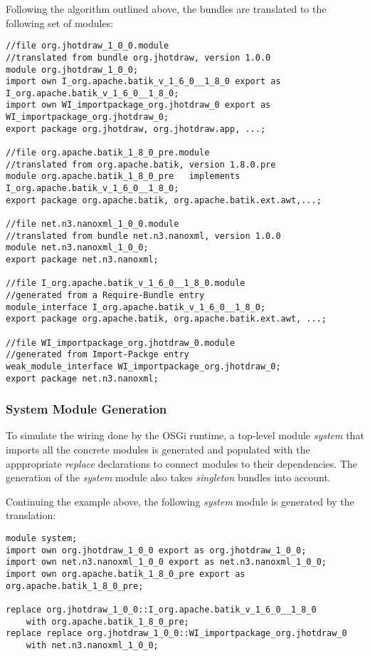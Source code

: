 Following the algorithm outlined above, the bundles are translated to the following set of modules:

\begin{lstlisting}[caption=Translated Bundles]
//file org.jhotdraw_1_0_0.module
//translated from bundle org.jhotdraw, version 1.0.0
module org.jhotdraw_1_0_0;
import own I_org.apache.batik_v_1_6_0__1_8_0 export as I_org.apache.batik_v_1_6_0__1_8_0;
import own WI_importpackage_org.jhotdraw_0 export as WI_importpackage_org.jhotdraw_0;
export package org.jhotdraw, org.jhotdraw.app, ...;

//file org.apache.batik_1_8_0_pre.module
//translated from org.apache.batik, version 1.8.0.pre
module org.apache.batik_1_8_0_pre	implements I_org.apache.batik_v_1_6_0__1_8_0;
export package org.apache.batik, org.apache.batik.ext.awt,...;

//file net.n3.nanoxml_1_0_0.module
//translated from bundle net.n3.nanoxml, version 1.0.0
module net.n3.nanoxml_1_0_0;
export package net.n3.nanoxml;

//file I_org.apache.batik_v_1_6_0__1_8_0.module
//generated from a Require-Bundle entry
module_interface I_org.apache.batik_v_1_6_0__1_8_0;
export package org.apache.batik, org.apache.batik.ext.awt, ...;

//file WI_importpackage_org.jhotdraw_0.module
//generated from Import-Packge entry
weak_module_interface WI_importpackage_org.jhotdraw_0;
export package net.n3.nanoxml;
\end{lstlisting}

\subsubsection{System Module Generation}

To simulate the wiring done by the OSGi runtime, a top-level module \textit{system} that imports all 
the concrete modules is generated and populated with the apppropriate \textit{replace} declarations to connect modules to
their dependencies. The generation of the \textit{system} module also takes \textit{singleton}
bundles into account.

Continuing the example above, the following \textit{system} module is generated by the translation:

\begin{lstlisting}[caption=Generated System Module]
module system;
import own org.jhotdraw_1_0_0 export as org.jhotdraw_1_0_0;
import own net.n3.nanoxml_1_0_0 export as net.n3.nanoxml_1_0_0;
import own org.apache.batik_1_8_0_pre export as org.apache.batik_1_8_0_pre;

replace org.jhotdraw_1_0_0::I_org.apache.batik_v_1_6_0__1_8_0
	with org.apache.batik_1_8_0_pre;
replace replace org.jhotdraw_1_0_0::WI_importpackage_org.jhotdraw_0
	with net.n3.nanoxml_1_0_0;
\end{lstlisting}

